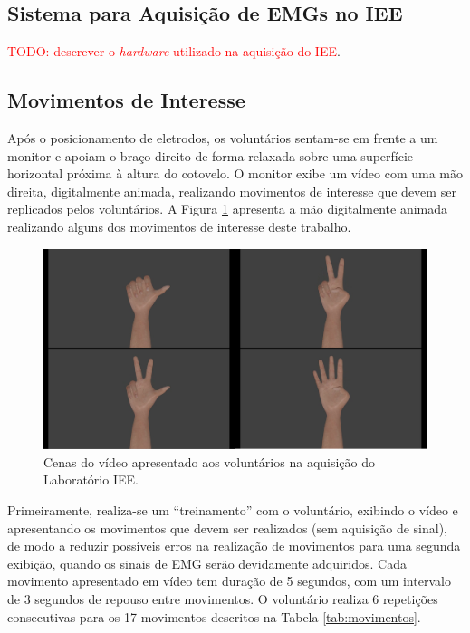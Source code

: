 			\subsection{Sistema para Aquisição de EMGs no IEE}
\textcolor{red}{TODO: descrever o \emph{hardware} utilizado na aquisição do IEE}.

			\subsection{Movimentos de Interesse}
Após o posicionamento de eletrodos, os voluntários sentam-se em frente a um monitor e apoiam o braço direito de forma relaxada sobre uma superfície horizontal próxima à altura do cotovelo. O monitor exibe um vídeo com uma mão direita, digitalmente animada, realizando movimentos de interesse que devem ser replicados pelos voluntários. A Figura \ref{fig:video} apresenta a mão digitalmente animada realizando alguns dos movimentos de interesse deste trabalho.

\begin{figure}[htb]
	\caption{\label{fig:video}Cenas do vídeo apresentado aos voluntários na aquisição do Laboratório IEE.}
	\begin{center}
	    \includegraphics[width=0.75\linewidth]{./img/scenes.png}
	\end{center}
\end{figure}

Primeiramente, realiza-se um ``treinamento'' com o voluntário, exibindo o vídeo e apresentando os movimentos que devem ser realizados (sem aquisição de sinal), de modo a reduzir possíveis erros na realização de movimentos para uma segunda exibição, quando os sinais de EMG serão devidamente adquiridos. Cada movimento apresentado em vídeo tem duração de 5 segundos, com um intervalo de 3 segundos de repouso entre movimentos. O voluntário realiza 6 repetições consecutivas para os 17 movimentos descritos na Tabela \ref{tab:movimentos}.

